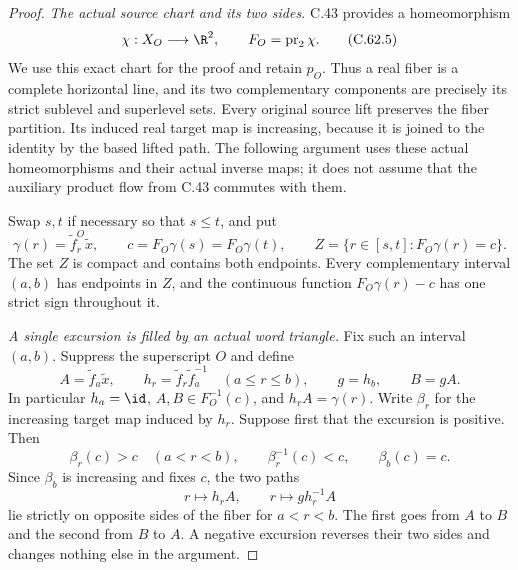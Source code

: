 \begin{proof}
\emph{The actual source chart and its two sides.}
C.43 provides a homeomorphism
\[
 \chi:X_O\longrightarrow\R^2,
       \qquad F_O=\operatorname{pr}_2\chi.
                                                               \tag{C.62.5}
\]
We use this exact chart for the proof and retain $p_O$.
Thus a real fiber is a complete horizontal line, and its
two complementary components are precisely its strict
sublevel and superlevel sets. Every original source lift
preserves the fiber partition. Its induced real target
map is increasing, because it is joined to the identity
by the based lifted path. The following argument uses
these actual homeomorphisms and their actual inverse
maps; it does not assume that the auxiliary product flow
from C.43 commutes with them.

Swap $s,t$ if necessary so that $s\leq t$, and put
\[
 \gamma(r)=\widetilde f_r^O\widetilde x,
       \qquad c=F_O\gamma(s)=F_O\gamma(t),
       \qquad
 Z=\{r\in[s,t]:F_O\gamma(r)=c\}.
                                                               \tag{C.62.6}
\]
The set $Z$ is compact and contains both endpoints.
Every complementary interval $(a,b)$ has endpoints
in $Z$, and the continuous function
$F_O\gamma(r)-c$ has one strict sign throughout it.

\emph{A single excursion is filled by an actual word triangle.}
Fix such an interval $(a,b)$. Suppress the superscript
$O$ and define
\[
 A=\widetilde f_a\widetilde x,\qquad
 h_r=\widetilde f_r\widetilde f_a^{-1}
       \quad(a\leq r\leq b),\qquad
 g=h_b,\qquad B=gA.
                                                               \tag{C.62.7}
\]
In particular $h_a=\id$, $A,B\in F_O^{-1}(c)$, and
$h_rA=\gamma(r)$.
Write $\beta_r$ for the increasing target map induced
by $h_r$. Suppose first that the excursion is positive.
Then
\[
 \beta_r(c)>c\quad(a<r<b),\qquad
 \beta_r^{-1}(c)<c,\qquad \beta_b(c)=c.
                                                               \tag{C.62.8}
\]
Since $\beta_b$ is increasing and fixes $c$, the two
paths
\[
       r\longmapsto h_rA,\qquad
       r\longmapsto g h_r^{-1}A
                                                               \tag{C.62.9}
\]
lie strictly on opposite sides of the fiber for
$a<r<b$. The first goes from $A$ to $B$ and the second
from $B$ to $A$. A negative excursion reverses their
two sides and changes nothing else in the argument.


\end{proof}
